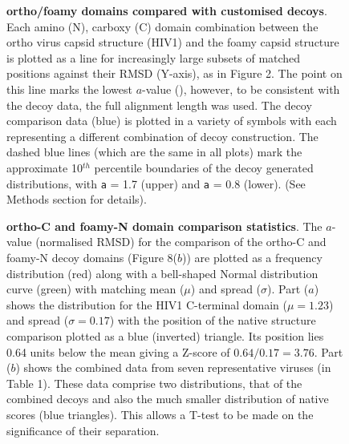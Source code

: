 \begin{figure}
\centering
{}
\begin{footnotesize}
\caption{
\label{Fig:sapit}
{\bf ortho/foamy domains compared with customised decoys}.
Each amino (N), carboxy (C) domain combination between the ortho virus capsid structure (HIV1)
and the foamy capsid structure is plotted as a line for increasingly large subsets of matched
positions against their RMSD (Y-axis), as in Figure 2.  The point on this line marks the lowest
$a$-value (), however, to be consistent with the decoy data, the full alignment length
was used.  The decoy comparison data (blue) is plotted in a variety of symbols
with each representing a different combination of decoy construction.  The dashed blue lines
(which are the same in all plots) mark the approximate 10$^{th}$ percentile boundaries of
the decoy generated distributions,  with {\tt a} = 1.7 (upper) and  {\tt a} = 0.8 (lower). 
(See Methods section for details).
}
\end{footnotesize}
\end{figure}

\begin{figure}
\centering
{}
\begin{footnotesize}
\caption{
\label{Fig:norms}
{\bf ortho-C and foamy-N domain comparison statistics}.
The $a$-value (normalised RMSD) for the comparison of the ortho-C and foamy-N decoy domains
(Figure 8($b$)) are plotted as a frequency distribution (red) along with a bell-shaped
Normal distribution curve (green) with matching mean ($\mu$) and spread ($\sigma$).
Part ($a$) shows the distribution for the HIV1 C-terminal domain ($\mu = 1.23$) and spread ($\sigma = 0.17$)
with the position of the native structure comparison plotted as a blue (inverted) triangle.  
Its position lies 0.64 units below the mean giving a Z-score of $0.64/0.17 = 3.76$.
Part ($b$) shows the combined data from seven representative viruses (in Table 1).
These data comprise two distributions, that of the combined decoys and also the much smaller
distribution of native scores (blue triangles).   This allows a T-test to be made on the
significance of their separation.
}
\end{footnotesize}
\end{figure}

